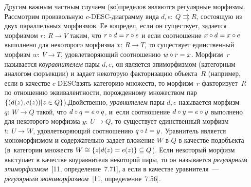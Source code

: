 \begin{multicols}{2}
 Другим важным частным случаем (ко)пределов являются регулярные
морфизмы. Рассмотрим произвольную $c$-DESC-диаграмму вида $d, e:\ Q
\rightrightarrows R$, состоящую из двух параллельных морфизмов. Ее копредел,
если он существует, задается морфизмом $r:\ R \to V$ таким, что $r \circ d \hm=
r \circ e$ и если соотношение $x \circ d \hm= x \circ e$ выполнено для
некоторого морфизма $x:\ R \to T$, то существует единственный морфизм
$w:\ V \to T$, удовлетворяющий соотношению $w \circ r \hm= x$. Морфизм~$r$
называется \textit{коуравнителем} пары $d, e$, он является эпиморфизмом
(категорным аналогом сюръекции) и задает некоторую факторизацию
объекта~$R$ (например, если в качестве $c$-DESC\linebreak взять категорию
множеств, то морфизм~$r$ факторизует~$R$ по отношению эквивалентности,
порож\-денному множеством пар $\{(d(z), e(z)) \vert z \hm\in Q\}$).\linebreak Двойственно,
\textit{уравнителем} пары $d, e$ называется морфизм $q:\ W \to Q$ такой, что
$d \circ q \hm= e \circ q$, и~если соотношение $d \circ y \hm= e \circ y$ выполнено
для некоторого морфизма $y:\ U \to Q$, то существует единственный морфизм
$t:\ U \to W$, удовлетворяющий соотношению $q \circ t \hm= y$. Уравнитель
является мономорфизмом и содержательно задает вложение $W$ в $Q$ в
качестве подобъекта (в~категории множеств $W\hm\cong \{z \vert d(z) \hm=
e(z)\} \hm\subseteq Q$). Если некоторый морфизм выступает в качестве
коуравнителя некоторой пары, то он называется \textit{регулярным
эпиморфизмом}~[11, определение~7.71], а если в качестве уравнителя~---
\textit{регулярным мономорфизмом}~[11, определение~7.56].

 \begin{center}
 \mbox{%
 \epsfxsize=53.148mm
 }
 \end{center}



\end{multicols}
